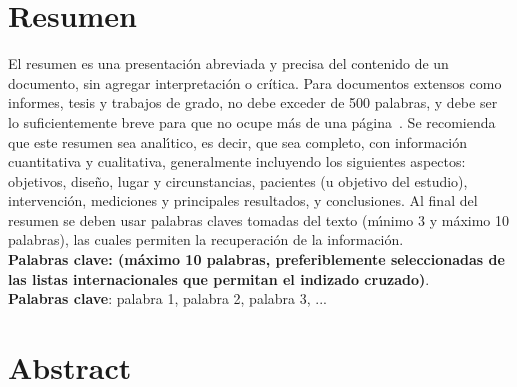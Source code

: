 \section*{Resumen}

El resumen es una presentación abreviada y precisa del contenido de un documento, sin agregar interpretación o crítica. Para documentos extensos como informes, tesis y trabajos de grado, no debe exceder de 500 palabras, y debe ser lo suficientemente breve para que no ocupe más de una página~\cite{NTC14862008}. Se recomienda que este resumen sea anal\'{\i}tico, es decir, que sea completo, con informaci\'{o}n cuantitativa y cualitativa, generalmente incluyendo los siguientes aspectos: objetivos, dise\~{n}o, lugar y circunstancias, pacientes (u objetivo del estudio), intervenci\'{o}n, mediciones y principales resultados, y conclusiones. Al final del resumen se deben usar palabras claves tomadas del texto (m\'{\i}nimo 3 y m\'{a}ximo 10 palabras), las cuales permiten la recuperaci\'{o}n de la informaci\'{o}n.\\

\textbf{\small Palabras clave: (m\'{a}ximo 10 palabras, preferiblemente seleccionadas de las listas internacionales que permitan el indizado cruzado)}.\\

\textbf{Palabras clave}: palabra 1, palabra 2, palabra 3, ...

\newpage
\section*{Abstract}

